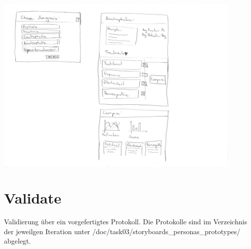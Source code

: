 \documentclass[a4paper]{scrreprt}
\begin{document}
\includegraphics[width=0.9\textwidth]{storyboards_personas_prototypes/iteration3/eller1_storyboard2_prototype.png}

\section{Validate}
Validierung über ein vorgefertigtes Protokoll. Die Protokolle sind im Verzeichnis der jeweilgen Iteration unter /doc/task03/storyboards\_personas\_prototypes/ abgelegt.
\end{document}
